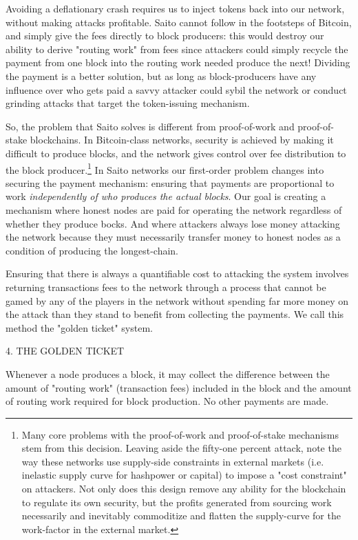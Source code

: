 \documentclass[11pt, oneside]{article}   	%
\begin{document}
\begin{multicols}{2}
Avoiding a deflationary crash requires us to inject tokens back into our network, without making attacks profitable. Saito cannot follow in the footsteps of Bitcoin, and simply give the fees directly to block producers: this would destroy our ability to derive "routing work" from fees since attackers could simply recycle the payment from one block into the routing work needed produce the next! Dividing the payment is a better solution, but as long as block-producers have any influence over who gets paid a savvy attacker could sybil the network or conduct grinding attacks that target the token-issuing mechanism. 

So, the problem that Saito solves is different from proof-of-work and proof-of-stake blockchains. In Bitcoin-class networks, security is achieved by making it difficult to produce blocks, and the network gives control over fee distribution to the block producer.\footnote[1]{Many core problems with the proof-of-work and proof-of-stake mechanisms stem from this decision. Leaving aside the fifty-one percent attack, note the way these networks use supply-side constraints in external markets (i.e. inelastic supply curve for hashpower or capital) to impose a "cost constraint" on attackers. Not only does this design remove any ability for the blockchain to regulate its own security, but the profits generated from sourcing work necessarily and inevitably commoditize and flatten the supply-curve for the work-factor in the external market.} In Saito networks our first-order problem changes into securing the payment mechanism: ensuring that payments are proportional to work {\textit{independently of who produces the actual blocks}}. Our goal is creating a mechanism where honest nodes are paid for operating the network regardless of whether they produce bocks. And where attackers always lose money attacking the network because they must necessarily transfer money to honest nodes as a condition of producing the longest-chain.

Ensuring that there is always a quantifiable cost to attacking the system involves returning transactions fees to the network through a process that cannot be gamed by any of the players in the network without spending far more money on the attack than they stand to benefit from collecting the payments. We call this method the "golden ticket" system.


4. THE GOLDEN TICKET

Whenever a node produces a block, it may collect the difference between the amount of "routing work" (transaction fees) included in the block and the amount of routing work required for block production. No other payments are made.


\end{multicols}
\end{document}

